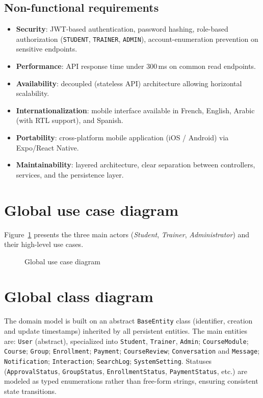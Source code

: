 \documentclass[a4paper,12pt]{report}
\begin{document}
\subsection{Non-functional requirements}
\begin{itemize}[leftmargin=*]
  \item \textbf{Security}: JWT-based authentication, password hashing,
        role-based authorization (\texttt{STUDENT}, \texttt{TRAINER},
        \texttt{ADMIN}), account-enumeration prevention on sensitive
        endpoints.
  \item \textbf{Performance}: API response time under 300\,ms on common
        read endpoints.
  \item \textbf{Availability}: decoupled (stateless API) architecture
        allowing horizontal scalability.
  \item \textbf{Internationalization}: mobile interface available in
        French, English, Arabic (with RTL support), and Spanish.
  \item \textbf{Portability}: cross-platform mobile application (iOS /
        Android) via Expo/React Native.
  \item \textbf{Maintainability}: layered architecture, clear separation
        between controllers, services, and the persistence layer.
\end{itemize}

\section{Global use case diagram}
Figure~\ref{fig:uc-global} presents the three main actors (\emph{Student},
\emph{Trainer}, \emph{Administrator}) and their high-level use cases.

\begin{figure}[H]
\centering
\caption{Global use case diagram}
\label{fig:uc-global}
\end{figure}

\section{Global class diagram}
The domain model is built on an abstract \texttt{BaseEntity} class
(identifier, creation and update timestamps) inherited by all persistent
entities. The main entities are: \texttt{User} (abstract), specialized into
\texttt{Student}, \texttt{Trainer}, \texttt{Admin}; \texttt{CourseModule};
\texttt{Course}; \texttt{Group}; \texttt{Enrollment}; \texttt{Payment};
\texttt{CourseReview}; \texttt{Conversation} and \texttt{Message};
\texttt{Notification}; \texttt{Interaction}; \texttt{SearchLog};
\texttt{SystemSetting}. Statuses (\texttt{ApprovalStatus},
\texttt{GroupStatus}, \texttt{EnrollmentStatus}, \texttt{PaymentStatus},
etc.) are modeled as typed enumerations rather than free-form strings,
ensuring consistent state transitions.
\end{document}

